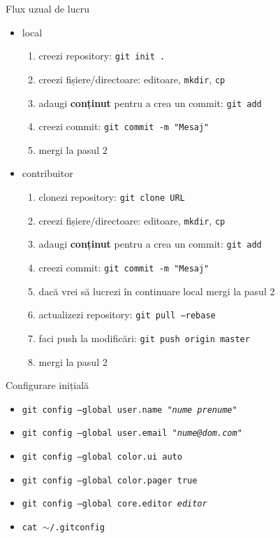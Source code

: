 \documentclass{beamer}
\begin{document}
\begin{frame}{Flux uzual de lucru}
  \begin{itemize}
    \item local
      \begin{enumerate}
	\item creezi repository: \texttt{git init .}
	\item creezi fișiere/directoare: editoare, \texttt{mkdir}, \texttt{cp}
	\item adaugi \textbf{conținut} pentru a crea un commit: \texttt{git
	  add}
	\item creezi commit: \texttt{git commit -m "Mesaj"}
	\item mergi la pasul 2
      \end{enumerate}
    \item contribuitor
      \begin{enumerate}
	\item clonezi repository: \texttt{git clone URL}
	\item creezi fișiere/directoare: editoare, \texttt{mkdir}, \texttt{cp}
	\item adaugi \textbf{conținut} pentru a crea un commit: \texttt{git
	  add}
	\item creezi commit: \texttt{git commit -m "Mesaj"}
	\item dacă vrei să lucrezi în continuare local mergi la pasul 2
	\item actualizezi repository: \texttt{git pull --rebase}
	\item faci push la modificări: \texttt{git push origin master}
	\item mergi la pasul 2
      \end{enumerate}
  \end{itemize}
\end{frame}

\begin{frame}{Configurare inițială}
  \begin{itemize}
    \item \texttt{git config --global user.name "\textit{nume prenume}"}
    \item \texttt{git config --global user.email "\textit{nume@dom.com}"}
    \item \texttt{git config --global color.ui auto}
    \item \texttt{git config --global color.pager true}
    \item \texttt{git config --global core.editor \textit{editor}}
    \item \texttt{cat $\sim$/.gitconfig}
  \end{itemize}
\end{frame}
\end{document}
